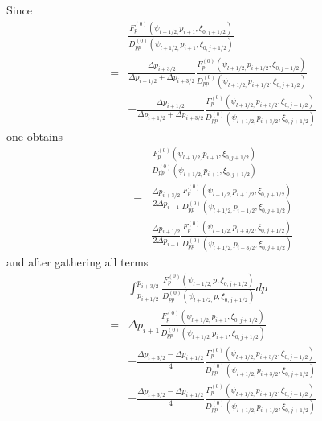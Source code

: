 Since
\begin{eqnarray}
&&\frac{F_{p}^{\left( 0\right) }\left( \psi _{l+1/2,}p_{i+1},\xi
_{0,j+1/2}\right) }{D_{pp}^{\left( 0\right) }\left( \psi
_{l+1/2,}p_{i+1},\xi _{0,j+1/2}\right) }  \nonumber \\
&=&\frac{\Delta p_{i+3/2}}{\Delta p_{i+1/2}+\Delta p_{i+3/2}}\frac{
F_{p}^{\left( 0\right) }\left( \psi _{l+1/2,}p_{i+1/2},\xi _{0,j+1/2}\right)
}{D_{pp}^{\left( 0\right) }\left( \psi _{l+1/2,}p_{i+1/2},\xi
_{0,j+1/2}\right) }  \nonumber \\
&&+\frac{\Delta p_{i+1/2}}{\Delta p_{i+1/2}+\Delta p_{i+3/2}}\frac{
F_{p}^{\left( 0\right) }\left( \psi _{l+1/2,}p_{i+3/2},\xi _{0,j+1/2}\right)
}{D_{pp}^{\left( 0\right) }\left( \psi _{l+1/2,}p_{i+3/2},\xi
_{0,j+1/2}\right) }
\end{eqnarray}
one obtains
\begin{eqnarray}
&&\frac{F_{p}^{\left( 0\right) }\left( \psi _{l+1/2,}p_{i+1},\xi
_{0,j+1/2}\right) }{D_{pp}^{\left( 0\right) }\left( \psi
_{l+1/2,}p_{i+1},\xi _{0,j+1/2}\right) }  \nonumber \\
&=&\frac{\Delta p_{i+3/2}}{2\Delta p_{i+1}}\frac{F_{p}^{\left( 0\right)
}\left( \psi _{l+1/2,}p_{i+1/2},\xi _{0,j+1/2}\right) }{D_{pp}^{\left(
0\right) }\left( \psi _{l+1/2,}p_{i+1/2},\xi _{0,j+1/2}\right) }  \nonumber
\\
&&\frac{\Delta p_{i+1/2}}{2\Delta p_{i+1}}\frac{F_{p}^{\left( 0\right)
}\left( \psi _{l+1/2,}p_{i+3/2},\xi _{0,j+1/2}\right) }{D_{pp}^{\left(
0\right) }\left( \psi _{l+1/2,}p_{i+3/2},\xi _{0,j+1/2}\right) }
\end{eqnarray}
and after gathering all terms
\begin{eqnarray}
&&\int_{p_{i+1/2}}^{p_{i+3/2}}\frac{F_{p}^{\left( 0\right) }\left( \psi
_{l+1/2,}p,\xi _{0,j+1/2}\right) }{D_{pp}^{\left( 0\right) }\left( \psi
_{l+1/2,}p,\xi _{0,j+1/2}\right) }dp  \nonumber \\
&=&\Delta p_{i+1}\frac{F_{p}^{\left( 0\right) }\left( \psi
_{l+1/2,}p_{i+1},\xi _{0,j+1/2}\right) }{D_{pp}^{\left( 0\right) }\left(
\psi _{l+1/2,}p_{i+1},\xi _{0,j+1/2}\right) }  \nonumber \\
&&+\frac{\Delta p_{i+3/2}-\Delta p_{i+1/2}}{4}\frac{F_{p}^{\left( 0\right)
}\left( \psi _{l+1/2,}p_{i+3/2},\xi _{0,j+1/2}\right) }{D_{pp}^{\left(
0\right) }\left( \psi _{l+1/2,}p_{i+3/2},\xi _{0,j+1/2}\right) }  \nonumber
\\
&&-\frac{\Delta p_{i+3/2}-\Delta p_{i+1/2}}{4}\frac{F_{p}^{\left( 0\right)
}\left( \psi _{l+1/2,}p_{i+1/2},\xi _{0,j+1/2}\right) }{D_{pp}^{\left(
0\right) }\left( \psi _{l+1/2,}p_{i+1/2},\xi _{0,j+1/2}\right) }
\end{eqnarray}

